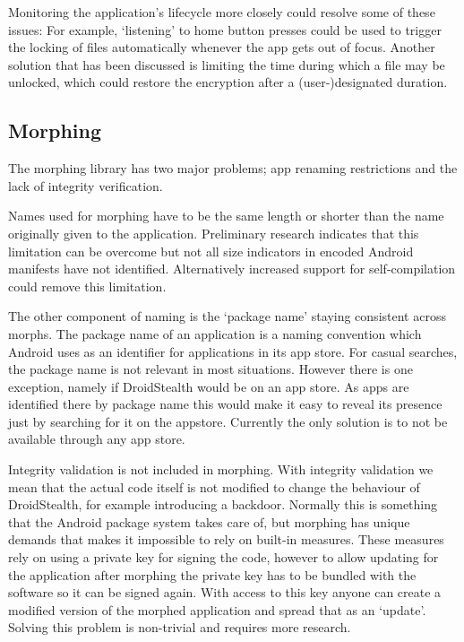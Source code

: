 Monitoring the application's lifecycle more closely could resolve some of these issues:
For example, `listening' to home button presses could be used to trigger the locking of files automatically whenever the app gets out of focus.
Another solution that has been discussed is limiting the time during which a file may be unlocked, which could restore the encryption after a (user-)designated duration.

\subsection{Morphing} 
\label{sec:limitations:morphing}

The morphing library has two major problems; app renaming restrictions and the lack of integrity verification.

Names used for morphing have to be the same length or shorter than the name originally given to the application.
Preliminary research indicates that this limitation can be overcome but not all size indicators in encoded Android manifests have not identified.
Alternatively increased support for self-compilation could remove this limitation.

The other component of naming is the `package name' staying consistent across morphs. 
The package name of an application is a naming convention which Android uses as an identifier for applications in its app store.
For casual searches, the package name is not relevant in most situations.
However there is one exception, namely if DroidStealth would be on an app store. 
As apps are identified there by package name this would make it easy to reveal its presence just by searching for it on the appstore.
Currently the only solution is to not be available through any app store.

Integrity validation is not included in morphing.
With integrity validation we mean that the actual code itself is not modified to change the behaviour of DroidStealth, for example introducing a backdoor.
Normally this is something that the Android package system takes care of, but morphing has unique demands that makes it impossible to rely on built-in measures.
These measures rely on using a private key for signing the code, however to allow updating for the application after morphing the private key has to be bundled with the software so it can be signed again.
With access to this key anyone can create a modified version of the morphed application and spread that as an `update'.
Solving this problem is non-trivial and requires more research.

